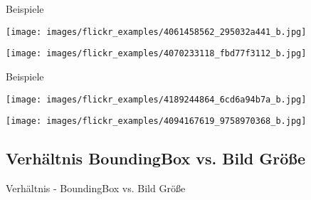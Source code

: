 \documentclass[18pt]{beamer}
\begin{document}
\begin{frame}{Beispiele}
\begin{minipage}[c]{0.4\textwidth}
	\texttt{[image: images/flickr\_examples/4061458562\_295032a441\_b.jpg]}
\end{minipage}
\begin{minipage}[c]{0.14\textwidth}
	\hfill
\end{minipage}	
\begin{minipage}[c]{0.4\textwidth}
	\texttt{[image: images/flickr\_examples/4070233118\_fbd77f3112\_b.jpg]}
\end{minipage}
\end{frame}

\begin{frame}{Beispiele}
\begin{minipage}[c]{0.4\textwidth}
	\texttt{[image: images/flickr\_examples/4189244864\_6cd6a94b7a\_b.jpg]}
\end{minipage}
\begin{minipage}[c]{0.18\textwidth}
	\hfill
\end{minipage}
\begin{minipage}[c]{0.4\textwidth}
	\texttt{[image: images/flickr\_examples/4094167619\_9758970368\_b.jpg]}
\end{minipage}
\end{frame}

\subsection{Verhältnis BoundingBox vs. Bild Größe}
\begin{frame}{Verhältnis - BoundingBox vs. Bild Größe}
\begin{figure}
\end{figure}
\end{frame}
\end{document}
